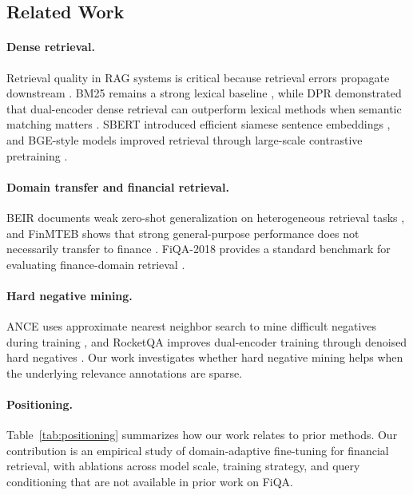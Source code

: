 \documentclass{article} %
\begin{document}
\subsection{Related Work}

\paragraph{Dense retrieval.}
Retrieval quality in RAG systems is critical because retrieval errors propagate downstream \citep{lewis2020retrieval}.
BM25 remains a strong lexical baseline \citep{robertson2009probabilistic}, while DPR demonstrated that dual-encoder dense retrieval can outperform lexical methods when semantic matching matters \citep{karpukhin2020dense}.
SBERT introduced efficient siamese sentence embeddings \citep{reimers2019sentence}, and BGE-style models improved retrieval through large-scale contrastive pretraining \citep{xiao2023cpack,flagembedding2023}.

\paragraph{Domain transfer and financial retrieval.}
BEIR documents weak zero-shot generalization on heterogeneous retrieval tasks \citep{thakur2021beir}, and FinMTEB shows that strong general-purpose performance does not necessarily transfer to finance \citep{tang2025finmteb}.
FiQA-2018 provides a standard benchmark for evaluating finance-domain retrieval \citep{maia201818}.

\paragraph{Hard negative mining.}
ANCE uses approximate nearest neighbor search to mine difficult negatives during training \citep{xiong2020approximate}, and RocketQA improves dual-encoder training through denoised hard negatives \citep{qu2021rocketqa}.
Our work investigates whether hard negative mining helps when the underlying relevance annotations are sparse.

\paragraph{Positioning.}
Table~\ref{tab:positioning} summarizes how our work relates to prior methods.
Our contribution is an empirical study of domain-adaptive fine-tuning for financial retrieval, with ablations across model scale, training strategy, and query conditioning that are not available in prior work on FiQA.
\end{document}
